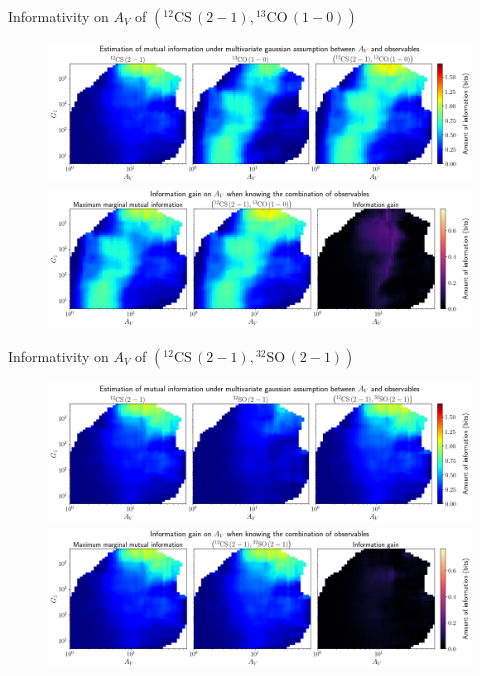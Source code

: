\documentclass{beamer}
\begin{document}
\begin{frame}{Informativity on $A_V$ of $\left(\mathrm{^{12}CS\,(2-1)},\mathrm{^{13}CO\,(1-0)}\right)$}
    \begin{figure}
        \centering
        \includegraphics[width=0.95\linewidth]{../linearinfogauss/av__12cs21_13co10_linearinfogauss.png}
        \vfill
        \includegraphics[width=0.95\linewidth]{../linearinfogauss/av__12cs21_13co10_linearinfogauss_gain.png}
    \end{figure}
\end{frame}

\begin{frame}{Informativity on $A_V$ of $\left(\mathrm{^{12}CS\,(2-1)},\mathrm{^{32}SO\,(2-1)}\right)$}
    \begin{figure}
        \centering
        \includegraphics[width=0.95\linewidth]{../linearinfogauss/av__12cs21_32so21_linearinfogauss.png}
        \vfill
        \includegraphics[width=0.95\linewidth]{../linearinfogauss/av__12cs21_32so21_linearinfogauss_gain.png}
    \end{figure}
\end{frame}
\end{document}
